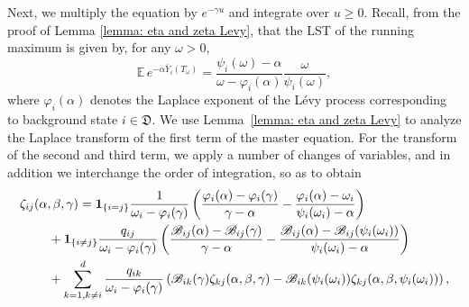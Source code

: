\documentclass[reqno,12pt]{amsart}
\newcommand{\bs}{\boldsymbol}
\newcommand{\defD}{{\mathfrak D}}
\begin{document}
Next, we multiply the equation by $e^{-\gamma u}$ and integrate over $u\geqslant 0$. 
Recall, from the proof of Lemma \ref{lemma: eta and zeta Levy}, that the LST of the running maximum is given by, for any $\omega > 0$,
\begin{equation*}
    {\mathbb E}\, e^{-\alpha \bar Y_i(T_\omega)}
    = \frac{\psi_i(\omega) - \alpha}{\omega - \varphi_i(\alpha)}
      \frac{\omega}{\psi_i(\omega)},
\end{equation*}
where $\varphi_i(\alpha)$ denotes the Laplace exponent of the L\'evy process corresponding to background state $i\in\defD$. We use Lemma~\ref{lemma: eta and zeta Levy} to analyze the Laplace transform of the first term of the master equation. For the transform of the second and third term, we apply a number of changes of variables, and in addition we interchange the order of integration, so as to obtain
\begin{align}\label{eq: sys eqs nonsub}
    \notag\zeta_{ij}&(\alpha, \beta, \gamma) = {\bs 1}_{\{i = j\}} \frac{1}{\omega_i - \varphi_i(\gamma)} \left( \frac{\varphi_i(\alpha) - \varphi_i(\gamma)}{\gamma - \alpha} - \frac{\varphi_i(\alpha) - \omega_i}{\psi_i(\omega_i) - \alpha} \right) \\
    \notag&\:\:\:\:\:+{\bs 1}_{\{i\neq j\}} \frac{q_{ij}}{\omega_i - \varphi_i(\gamma)} \left(\frac{\mathscr{B}_{ij}(\alpha) - \mathscr{B}_{ij}(\gamma)}{\gamma - \alpha} - \frac{\mathscr{B}_{ij}(\alpha) - \mathscr{B}_{ij}(\psi_i(\omega_i))}{\psi_i(\omega_i) - \alpha}\right)\\
    &\:\:\:\:\:+\sum_{k=1,k\neq i}^d \frac{q_{ik}}{\omega_i - \varphi_i(\gamma)}\left(\mathscr{B}_{ik}(\gamma)\zeta_{kj}(\alpha,\beta,\gamma) - \mathscr{B}_{ik}(\psi_i(\omega_i)) \zeta_{kj}(\alpha,\beta,\psi_i(\omega_i))\right),
\end{align}
\end{document}
